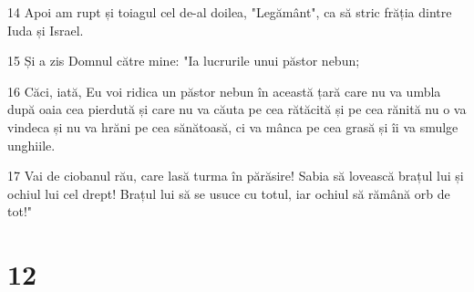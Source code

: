 \par 14 Apoi am rupt și toiagul cel de-al doilea, "Legământ", ca să stric frăția dintre Iuda și Israel.
\par 15 Și a zis Domnul către mine: "Ia lucrurile unui păstor nebun;
\par 16 Căci, iată, Eu voi ridica un păstor nebun în această țară care nu va umbla după oaia cea pierdută și care nu va căuta pe cea rătăcită și pe cea rănită nu o va vindeca și nu va hrăni pe cea sănătoasă, ci va mânca pe cea grasă și îi va smulge unghiile.
\par 17 Vai de ciobanul rău, care lasă turma în părăsire! Sabia să lovească brațul lui și ochiul lui cel drept! Brațul lui să se usuce cu totul, iar ochiul să rămână orb de tot!"

\chapter{12}

